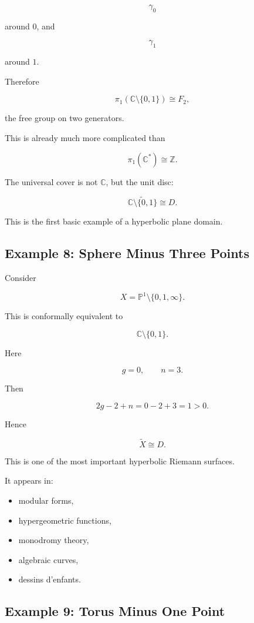 \documentclass[12pt,a4paper]{article}
\theoremstyle{notespace}
\begin{document}
\[
\gamma_0
\]

around \(0\), and

\[
\gamma_1
\]

around \(1\).

Therefore

\[
\pi_1(\mathbb C\setminus\{0,1\})
\cong
F_2,
\]

the free group on two generators.

This is already much more complicated than

\[
\pi_1(\mathbb C^*)\cong \mathbb Z.
\]

The universal cover is not \(\mathbb C\), but the unit disc:

\[
\widetilde{\mathbb C\setminus\{0,1\}}
\cong
D.
\]

This is the first basic example of a hyperbolic plane domain.

\subsection{Example 8: Sphere Minus Three Points}

Consider

\[
X
=
\mathbb P^1\setminus\{0,1,\infty\}.
\]

This is conformally equivalent to

\[
\mathbb C\setminus\{0,1\}.
\]

Here

\[
g=0,
\qquad
n=3.
\]

Then

\[
2g-2+n
=
0-2+3
=
1>0.
\]

Hence

\[
\widetilde X
\cong
D.
\]

This is one of the most important hyperbolic Riemann surfaces.

It appears in:

\begin{itemize}
	\item modular forms,
	\item hypergeometric functions,
	\item monodromy theory,
	\item algebraic curves,
	\item dessins d'enfants.
\end{itemize}

\subsection{Example 9: Torus Minus One Point}
\end{document}
